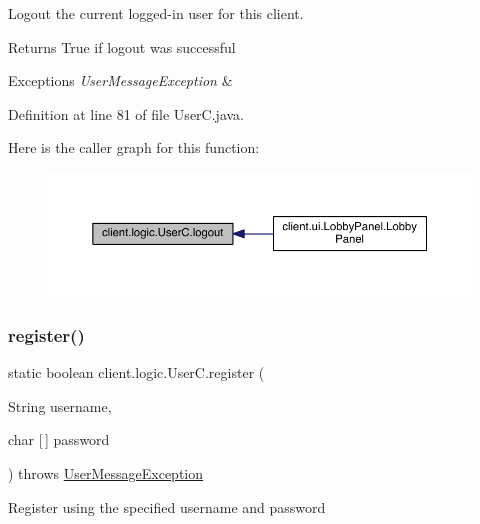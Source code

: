 Logout the current logged-\/in user for this client.

\begin{DoxyReturn}{Returns}
True if logout was successful 
\end{DoxyReturn}

\begin{DoxyExceptions}{Exceptions}
{\em User\+Message\+Exception} & \\
\hline
\end{DoxyExceptions}


Definition at line 81 of file User\+C.\+java.

Here is the caller graph for this function\+:
\nopagebreak
\begin{figure}[H]
\begin{center}
\leavevmode
\includegraphics[width=350pt]{classclient_1_1logic_1_1_user_c_a6609a9ab9414bda2dd3a6685cdec3771_icgraph}
\end{center}
\end{figure}
\hypertarget{classclient_1_1logic_1_1_user_c_a81ee75a5f1f4a278a71054a9c4f72609}{}\label{classclient_1_1logic_1_1_user_c_a81ee75a5f1f4a278a71054a9c4f72609} 
\subsubsection{\texorpdfstring{register()}{register()}}
{\footnotesize\ttfamily static boolean client.\+logic.\+User\+C.\+register (\begin{DoxyParamCaption}\item[{String}]{username,  }\item[{char \mbox{[}$\,$\mbox{]}}]{password }\end{DoxyParamCaption}) throws \hyperlink{classpt_1_1up_1_1fe_1_1lpro1613_1_1sharedlib_1_1exceptions_1_1_user_message_exception}{User\+Message\+Exception}\hspace{0.3cm}{\ttfamily [static]}}

Register using the specified username and password


